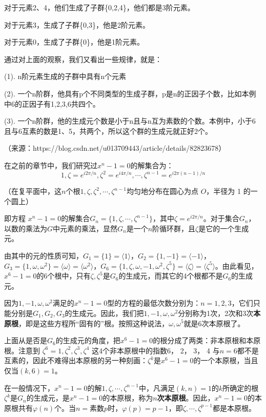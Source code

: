 \documentclass[12pt]{article}
\begin{document}
\begin{framed}
{对于元素2、4，他们生成了子群\{0,2,4\}，他们都是3阶元素。

对于元素3，生成了子群\{0,3\}，他是2阶元素。

对于元素0，生成了子群\{0\}，他是1阶元素。

通过对上面的观察，我们又看出一些规律，就是：

(1). n阶元素生成的子群中具有n个元素

(2). 一个n阶群，他具有p个不同类型的生成子群，p是n的正因子个数，比如本例中6的正因子有1,2,3,6共四个。

(3). 一个n阶群，他的生成元个数是小于n且与n互为素数的个数。本例中，小于6且与6互素的数是1、5，共两个，所以这个群的生成元就正好2个。

（来源：https://blog.csdn.net/u013709443/article/details/82823678）
}
\end{framed}

在之前的章节中，我们研究过$x^n - 1 = 0$的解集合为：
$$
1, \zeta = e^{i2\pi/n}, \zeta^2 = e^{i4\pi/n}, \cdots,  \zeta^{n-1} = e^{i2\pi(n-1)/n}
$$

（在复平面中，这$n$个根$1, \zeta, \zeta^2, \cdots, \zeta^{n-1}$均匀地分布在圆心为点 $O$，半径为 1 的一个圆上）

即方程 $x^n-1=0$的解集合$G_n = \{1, \zeta, \cdots, \zeta^{n-1}\}$，其中$\zeta = e^{i2\pi/n}$。对于集合$G_n$，以数的乘法为$G$中元素的乘法，显然$G_n$是一个$n$阶循环群，且$\zeta$是它的一个生成元。

由其中的元的性质可知，$G_1 = \{1\} = \langle 1 \rangle$，$G_2 = \{1, -1\} = \langle -1 \rangle$，$G_3 = \{1, \omega, \omega^2\} = \langle \omega \rangle = \langle \omega^2 \rangle$，$G_6 = \{1, \zeta, \omega, -1, \omega^2, \zeta^5\} = \langle \zeta \rangle = \langle \zeta^5 \rangle$。由此看见，$x^6-1=0$的6个根中，只有$\zeta, \zeta^5$是$G_6$的生成元，而其它的4个根都不是$G_6$的生成元。

因为$1, -1, \omega, \omega^2$满足的$x^n-1=0$型的方程的最低次数分别为：$n = 1, 2, 3$，它们只能分别是$G_1, G_2, G_3$的生成元。因此，我们把$1, -1, \omega, \omega^2$分别称为1次，2次和3次\textbf{本原根}，即是这些方程所“固有的”根。按照这种说法，$\omega, \omega^5$就是6次本原根了。

上面从是否是$G_6$的生成元的角度，把$x^6-1=0$的根分成了两类：非本原根和本原根。注意到 $\zeta^6=1, \zeta^2, \zeta^3, \zeta^4$ 这4个非本原根中的指数6， 2， 3， 4 与$n=6$都不是互素的，因此不难得出本原根的另一种刻画：$\zeta^k$是$x^6 - 1 = 0$的一个本原根，当且仅当$(k,6) = 1$。

在一般情况下，$x^n-1=0$的解$1, \zeta, \cdots, \zeta^{n-1}$中，凡满足$(k,n) = 1$的$k$所确定的根$\zeta^k$是$G_n$的生成元，是$x^n-1=0$的本原根，称为\textbf{$n$次本原根}。因此，$x^n-1=0$的本原根共有$\varphi(n)$个。当$n=$素数$p$时，$\varphi(p) = p - 1$，即$\zeta, \cdots, \zeta^{p-1}$都是本原根。
\end{document}
